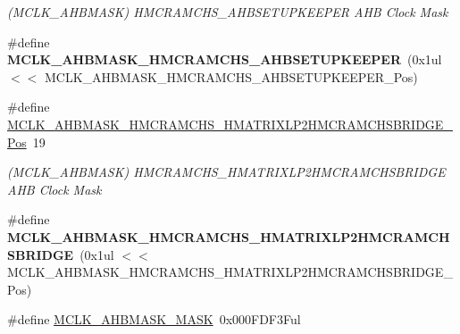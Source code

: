 \begin{DoxyCompactItemize}
\begin{DoxyCompactList}\small\item\em (M\+C\+L\+K\+\_\+\+A\+H\+B\+M\+A\+S\+K) H\+M\+C\+R\+A\+M\+C\+H\+S\+\_\+\+A\+H\+B\+S\+E\+T\+U\+P\+K\+E\+E\+P\+E\+R A\+H\+B Clock Mask \end{DoxyCompactList}\item 
\hypertarget{group___s_a_m_l21___m_c_l_k_ga0302adcf72766aec4850cc6f28f31df0}{}\#define {\bfseries M\+C\+L\+K\+\_\+\+A\+H\+B\+M\+A\+S\+K\+\_\+\+H\+M\+C\+R\+A\+M\+C\+H\+S\+\_\+\+A\+H\+B\+S\+E\+T\+U\+P\+K\+E\+E\+P\+E\+R}~(0x1ul $<$$<$ M\+C\+L\+K\+\_\+\+A\+H\+B\+M\+A\+S\+K\+\_\+\+H\+M\+C\+R\+A\+M\+C\+H\+S\+\_\+\+A\+H\+B\+S\+E\+T\+U\+P\+K\+E\+E\+P\+E\+R\+\_\+\+Pos)\label{group___s_a_m_l21___m_c_l_k_ga0302adcf72766aec4850cc6f28f31df0}

\item 
\hypertarget{group___s_a_m_l21___m_c_l_k_ga388647ec385ad699dc05f41e7dbfeb09}{}\#define \hyperlink{group___s_a_m_l21___m_c_l_k_ga388647ec385ad699dc05f41e7dbfeb09}{M\+C\+L\+K\+\_\+\+A\+H\+B\+M\+A\+S\+K\+\_\+\+H\+M\+C\+R\+A\+M\+C\+H\+S\+\_\+\+H\+M\+A\+T\+R\+I\+X\+L\+P2\+H\+M\+C\+R\+A\+M\+C\+H\+S\+B\+R\+I\+D\+G\+E\+\_\+\+Pos}~19\label{group___s_a_m_l21___m_c_l_k_ga388647ec385ad699dc05f41e7dbfeb09}

\begin{DoxyCompactList}\small\item\em (M\+C\+L\+K\+\_\+\+A\+H\+B\+M\+A\+S\+K) H\+M\+C\+R\+A\+M\+C\+H\+S\+\_\+\+H\+M\+A\+T\+R\+I\+X\+L\+P2\+H\+M\+C\+R\+A\+M\+C\+H\+S\+B\+R\+I\+D\+G\+E A\+H\+B Clock Mask \end{DoxyCompactList}\item 
\hypertarget{group___s_a_m_l21___m_c_l_k_ga3310a4a2949edeae1b9f052c77e5da61}{}\#define {\bfseries M\+C\+L\+K\+\_\+\+A\+H\+B\+M\+A\+S\+K\+\_\+\+H\+M\+C\+R\+A\+M\+C\+H\+S\+\_\+\+H\+M\+A\+T\+R\+I\+X\+L\+P2\+H\+M\+C\+R\+A\+M\+C\+H\+S\+B\+R\+I\+D\+G\+E}~(0x1ul $<$$<$ M\+C\+L\+K\+\_\+\+A\+H\+B\+M\+A\+S\+K\+\_\+\+H\+M\+C\+R\+A\+M\+C\+H\+S\+\_\+\+H\+M\+A\+T\+R\+I\+X\+L\+P2\+H\+M\+C\+R\+A\+M\+C\+H\+S\+B\+R\+I\+D\+G\+E\+\_\+\+Pos)\label{group___s_a_m_l21___m_c_l_k_ga3310a4a2949edeae1b9f052c77e5da61}

\item 
\hypertarget{group___s_a_m_l21___m_c_l_k_ga4ff9567101bdb1ceefebec27f64d817f}{}\#define \hyperlink{group___s_a_m_l21___m_c_l_k_ga4ff9567101bdb1ceefebec27f64d817f}{M\+C\+L\+K\+\_\+\+A\+H\+B\+M\+A\+S\+K\+\_\+\+M\+A\+S\+K}~0x000\+F\+D\+F3\+Ful\label{group___s_a_m_l21___m_c_l_k_ga4ff9567101bdb1ceefebec27f64d817f}


\end{DoxyCompactItemize}

